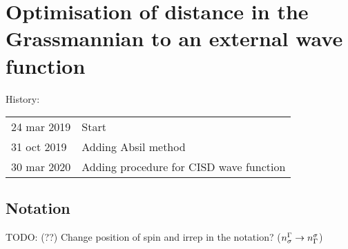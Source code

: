 \hypertarget{chap:dist_gr}{}
\chapter{Optimisation of distance in the Grassmannian to an external wave function}
\label{sec:dist_gr}

{History:
  
  \begin{tabular}{l@{ - }l}
    24 mar 2019 & Start\\
    31 oct 2019 & Adding Absil method\\
    30 mar 2020 & Adding procedure for CISD wave function\\
  \end{tabular}
}\vspace{3cm}


\section{Notation}

TODO: (??) Change position of spin and irrep in the notation? ($n_\sigma^{\Gamma} \to n_{\Gamma}^\sigma$)

